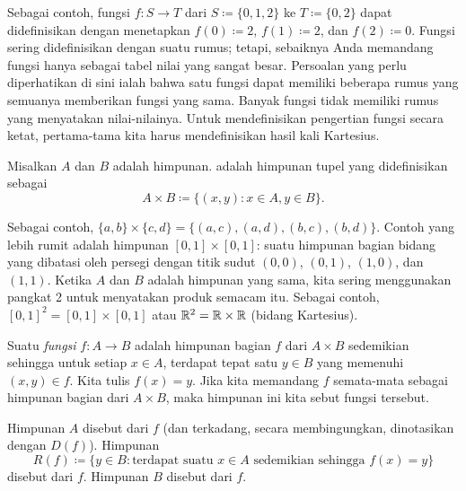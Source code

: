 Sebagai contoh, fungsi
$f \colon S \to T$ dari $S \coloneqq \{ 0, 1, 2 \}$ ke $T \coloneqq \{ 0, 2 \}$
dapat didefinisikan
dengan menetapkan $f(0) \coloneqq 2$, $f(1) \coloneqq 2$, dan $f(2) \coloneqq 0$.
%
Fungsi sering didefinisikan dengan suatu
rumus; tetapi, sebaiknya Anda memandang fungsi hanya sebagai tabel nilai yang sangat
besar.
Persoalan yang perlu diperhatikan di sini ialah bahwa satu fungsi dapat memiliki beberapa
rumus yang semuanya memberikan fungsi yang sama.
Banyak fungsi tidak memiliki
rumus yang menyatakan nilai-nilainya.
Untuk mendefinisikan pengertian fungsi secara ketat,
pertama-tama kita harus mendefinisikan hasil kali Kartesius.

\begin{defn}
Misalkan $A$ dan $B$ adalah himpunan.  \emph{}
adalah himpunan tupel yang didefinisikan sebagai
\begin{equation*}
A \times B \coloneqq
\bigl\{ (x,y) : x \in A, y \in B \bigr\} .
\end{equation*}
\end{defn}

Sebagai contoh, $\{ a,b \} \times \{ c , d\} =
\bigl\{
(a,c), (a,d), (b,c), (b,d)
\bigr\}$.
Contoh yang lebih rumit adalah himpunan $[0,1] \times [0,1]$: suatu himpunan bagian
bidang yang dibatasi oleh persegi dengan titik sudut $(0,0)$, $(0,1)$, $(1,0)$, dan $(1,1)$.
Ketika $A$ dan $B$ adalah himpunan yang sama, kita sering menggunakan pangkat 2 untuk menyatakan
produk semacam itu.  Sebagai contoh, $[0,1]^2 = 
[0,1] \times [0,1]$ atau ${\mathbb{R}}^2 = {\mathbb{R}} \times {\mathbb{R}}$ (bidang Kartesius).

\begin{defn}
Suatu \emph{fungsi} $f \colon A \to B$ adalah himpunan bagian $f$ dari $A \times B$
sedemikian sehingga untuk setiap $x \in A$, terdapat tepat satu $y \in B$ yang memenuhi $(x,y) \in f$.
Kita tulis $f(x) = y$.
Jika kita memandang $f$ semata-mata sebagai himpunan bagian dari $A \times B$,
maka himpunan ini kita sebut
\emph{} fungsi tersebut.

Himpunan $A$ disebut \emph{} dari $f$ (dan
terkadang, secara membingungkan, dinotasikan dengan $D(f)$).  Himpunan
\begin{equation*}
R(f) \coloneqq \{ y \in B : \text{terdapat suatu } x \in A \text{ sedemikian sehingga }
f(x)=y \}
\end{equation*}
disebut \emph{} dari $f$.
Himpunan $B$ disebut \emph{} dari $f$.
\end{defn}

